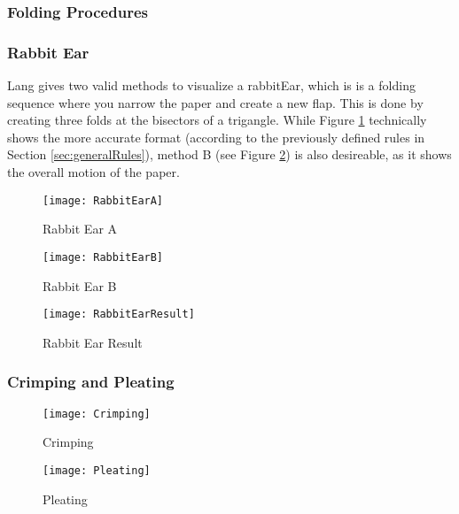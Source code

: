 \newpage
\subsubsection{Folding Procedures}
\subsubsection*{Rabbit Ear}
Lang gives two valid methods to visualize a \gls{rabbitEar}, which is is a folding sequence where you narrow the paper
and create a new flap. This is done by creating three folds at the bisectors of a trigangle. While Figure \ref{fig:rabbitEarA} technically shows the more accurate format (according to the previously defined rules in Section \ref{sec:generalRules}), method B (see Figure \ref{fig:rabbitEarB}) is also desireable, as it shows the overall motion of the paper.
\begin{figure*}[htbp]
    \centering
    \begin{subfigure}{0.27\textwidth}
        \texttt{[image: RabbitEarA]}
        \caption{Rabbit Ear A}
        \label{fig:rabbitEarA}
    \end{subfigure}
    \begin{subfigure}{0.35\textwidth}
        \texttt{[image: RabbitEarB]}
        \caption{Rabbit Ear B}
        \label{fig:rabbitEarB}
    \end{subfigure}
    \begin{subfigure}{0.33\textwidth}
	\texttt{[image: RabbitEarResult]}
	\caption{Rabbit Ear Result}
	\label{fig:rabbitEarResult}
    \end{subfigure}
    \caption{Both methods show a Rabbit Ear Fold}
    \label{fig:rabbitEarMethods}
\end{figure*}

\subsubsection*{Crimping and Pleating}
\begin{figure*}[htbp]
	\centering
	\begin{subfigure}{0.49\textwidth}
		\texttt{[image: Crimping]}
		\caption{Crimping}
		\label{fig:crimping}
	\end{subfigure}
	\begin{subfigure}{0.49\textwidth}
		\texttt{[image: Pleating]}
		\caption{Pleating}
		\label{fig:pleating}
	\end{subfigure}
\end{figure*}

